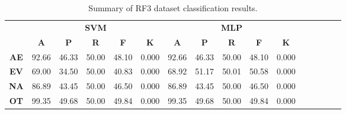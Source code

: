 \begin{landscape}
\begin{table}[htbp]
\footnotesize
\centering
\caption{Summary of RF3 dataset classification results.}
\label{tab:base_female}
\begin{tabular}{|c|c|c|c|c|c|c|c|c|c|c|c|c|c|c|c|}
\hline
\multirow{2}{*}{}	& \multicolumn{5}{c|}{\textbf{SVM}}												& \multicolumn{5}{c|}{\textbf{MLP}}												\\ \cline{2-11} 
					& \textbf{A}	& \textbf{P}	& \textbf{R}	& \textbf{F}	& \textbf{K}	& \textbf{A}	& \textbf{P}	& \textbf{R}	& \textbf{F}	& \textbf{K}	\\ \hline
\textbf{AE}			& 92.66			& 46.33			& 50.00			& 48.10			& 0.000			& 92.66			& 46.33			& 50.00			& 48.10			& 0.000			\\ \hline
\textbf{EV}			& 69.00			& 34.50			& 50.00			& 40.83			& 0.000			& 68.92			& 51.17			& 50.01			& 50.58			& 0.000			\\ \hline
\textbf{NA}			& 86.89			& 43.45			& 50.00			& 46.50			& 0.000			& 86.89			& 43.45			& 50.00			& 46.50			& 0.000			\\ \hline
\textbf{OT}			& 99.35			& 49.68			& 50.00			& 49.84			& 0.000			& 99.35			& 49.68			& 50.00			& 49.84			& 0.000			\\ \hline
\end{tabular}
\end{table}
\end{landscape}